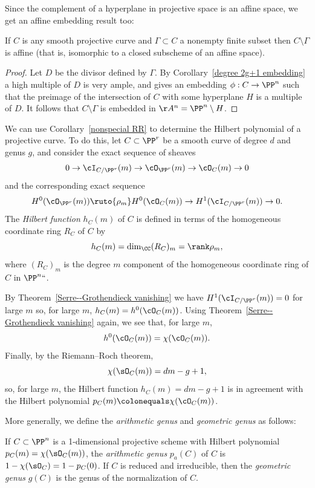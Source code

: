Since the complement of a hyperplane in projective space is an affine space, we get an affine embedding result too:

\begin{corollary}
 If $C$ is any smooth projective curve and $\Gamma \subset C$ a nonempty finite subset then $C \setminus \Gamma$ is affine (that
 is, isomorphic to a closed subscheme of an affine space).
\unif
\end{corollary}

\begin{proof}
Let $D$ be the divisor defined by $\Gamma$. By Corollary~\ref{degree 2g+1 embedding} a high multiple of $D$ is very ample,
and gives an embedding $\phi: C\to \PP^n$ such that the preimage of the intersection of $C$ with some hyperplane $H$
is a multiple of $D$. It follows that $C\setminus \Gamma$ is embedded in $\AA^n = \PP^n\setminus H$.
\end{proof}
 
We can  use Corollary~\ref{nonspecial RR} to determine the Hilbert polynomial of a projective curve. To do this, let $C \subset \PP^r$ be a smooth curve of degree $d$ and genus $g$, and consider the exact sequence of sheaves
$$
0 \to \cI_{C/\PP^r}(m) \to \cO_{\PP^r}(m) \to \cO_C(m) \to 0
$$
and the corresponding exact sequence
$$
 H^0(\cO_{\PP^r}(m)) \ruto{\rho_m} H^0(\cO_C(m)) \to H^1(\cI_{C/\PP^r}(m)) \to 0.
$$
The \emph{Hilbert function} $h_C(m)$ of $C$  is defined in terms of the
%
homogeneous coordinate ring $R_{C}$ of $C$ by
$$
h_C(m) = \dim_{\CC} (R_{C})_{m} = \rank \rho_m,
$$
where $(R_{C})_{m}$ is the degree $m$ component of the homogeneous coordinate ring of $C$ in $\PP^n` `$.

By Theorem~\ref{Serre--Grothendieck vanishing} we have
$H^1(\cI_{C/\PP^r}(m)) = 0$ for large $m$ so, for large $m$,
$h_{C}(m) =  h^0(\cO_C(m))$. Using 
Theorem~\ref{Serre--Grothendieck vanishing} again, we see that, for large $m$, 
$$
h^0(\cO_C(m)) = \chi(\cO_C(m)).
$$
Finally, by the Riemann--Roch theorem,
$$
\chi (\sO_{C}(m)) = dm-g+1,
$$ 
so, for large $m$, the Hilbert function $h_{C}(m) = dm-g+1$ is in agreement
with the Hilbert polynomial $p_{C}(m) \colonequals \chi(\cO_{C}(m))$.

More generally, we define the \emph{arithmetic genus} and \emph{geometric genus} as follows:
%
%
%
%

\begin{definition}\label{genus Hilbert}\label{pa}\label{genus formula}
If $C\subset \PP^n$ is a 1-dimensional projective scheme with Hilbert polynomial
$p_C(m) = \chi(\sO_C(m))$, the \emph{arithmetic genus} $p_a(C)$ 
of $C$ is $1-\chi(\sO_{C})=1-p_C(0)$. If $C$ is reduced and irreducible, then
%
%
the \emph{geometric genus} $g(C)$ is the genus of the normalization of $C$.
\end{definition}

